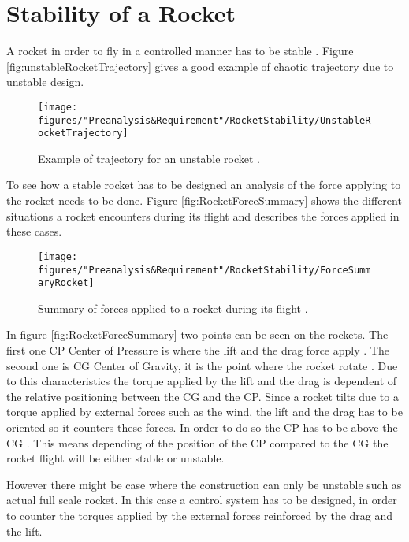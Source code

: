 \section{Stability of a Rocket}

A rocket in order to fly in a controlled manner has to be stable \cite{web:rocketnasa}. Figure \vref{fig:unstableRocketTrajectory} gives a good example of chaotic trajectory due to unstable design.

\begin{figure} [htbp]
	\centering
	\texttt{[image: figures/"Preanalysis\&Requirement"/RocketStability/UnstableRocketTrajectory]}
	\caption{Example of trajectory for an unstable rocket \cite{web:rocketnasa}.}
	\label{fig:unstableRocketTrajectory}
\end{figure}

To see how a stable rocket has to be designed an analysis of the force applying to the rocket needs to be done. Figure \vref{fig:RocketForceSummary} shows the different situations a rocket encounters during its flight and describes the forces applied in these cases.

\begin{figure} [htbp]
	\centering
	\texttt{[image: figures/"Preanalysis\&Requirement"/RocketStability/ForceSummaryRocket]}
	\caption{Summary of forces applied to a rocket during its flight \cite{web:rocketnasa}.}
	\label{fig:RocketForceSummary}
\end{figure}

In figure \vref{fig:RocketForceSummary} two points can be seen on the rockets. The first one CP Center of Pressure is where the  lift and the drag force apply \cite{web:rocketnasa}. The second one is CG Center of Gravity, it is the point where the rocket rotate \cite{web:rocketnasa}. Due to this characteristics the torque applied by the lift and the drag is dependent of the relative positioning between the CG and the CP. Since a rocket tilts due to a torque applied by external forces such as the wind, the lift and the drag has to be oriented so it counters these forces. In order to do so the CP has to be above the CG \cite{web:rocketnasa}.
This means depending of the position of the CP compared to the CG the rocket flight will be either stable or unstable.

However there might be case where the construction can only be unstable such as actual full scale rocket. In this case a control system has to be designed, in order to counter the torques applied by the external forces reinforced by the drag and the lift.
